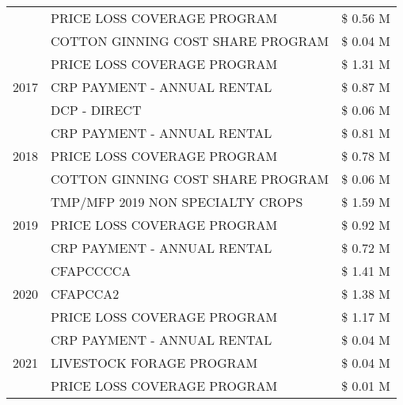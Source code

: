 \begin{tabular}{llr}
 & PRICE LOSS COVERAGE PROGRAM & \$ 0.56 M \\
 & COTTON GINNING COST SHARE PROGRAM & \$ 0.04 M \\
\cline{1-3}
\multirow[t]{3}{*}{2017} & PRICE LOSS COVERAGE PROGRAM & \$ 1.31 M \\
 & CRP PAYMENT - ANNUAL RENTAL & \$ 0.87 M \\
 & DCP - DIRECT & \$ 0.06 M \\
\cline{1-3}
\multirow[t]{3}{*}{2018} & CRP PAYMENT - ANNUAL RENTAL & \$ 0.81 M \\
 & PRICE LOSS COVERAGE PROGRAM & \$ 0.78 M \\
 & COTTON GINNING COST SHARE PROGRAM & \$ 0.06 M \\
\cline{1-3}
\multirow[t]{3}{*}{2019} & TMP/MFP 2019 NON SPECIALTY CROPS & \$ 1.59 M \\
 & PRICE LOSS COVERAGE PROGRAM & \$ 0.92 M \\
 & CRP PAYMENT - ANNUAL RENTAL & \$ 0.72 M \\
\cline{1-3}
\multirow[t]{3}{*}{2020} & CFAPCCCCA & \$ 1.41 M \\
 & CFAPCCA2 & \$ 1.38 M \\
 & PRICE LOSS COVERAGE PROGRAM & \$ 1.17 M \\
\cline{1-3}
\multirow[t]{3}{*}{2021} & CRP PAYMENT - ANNUAL RENTAL & \$ 0.04 M \\
 & LIVESTOCK FORAGE PROGRAM & \$ 0.04 M \\
 & PRICE LOSS COVERAGE PROGRAM & \$ 0.01 M \\
\cline{1-3}
\bottomrule
\end{tabular}
